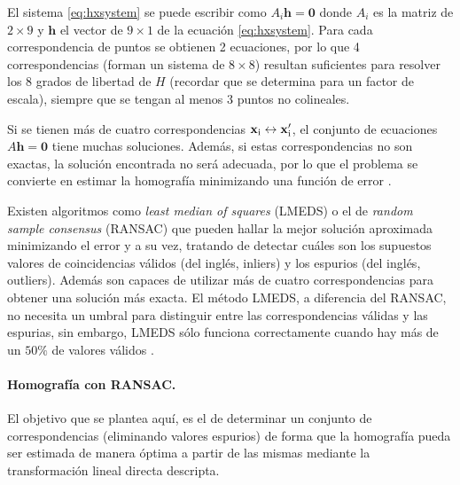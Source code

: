 El sistema \ref{eq:hxsystem} se puede escribir como $A_{i} \mathbf{h}=\mathbf{0}$ donde $A_{i}$ es la matriz de $2 \times 9$ y $\mathbf{h}$ el vector de $9 \times 1$ de la ecuación \eqref{eq:hxsystem}. Para cada correspondencia de puntos se obtienen 2 ecuaciones, por lo que 4 correspondencias (forman un sistema de $8 \times 8$) resultan suficientes para resolver los 8 grados de libertad de $\textit{H}$ (recordar que se determina para un factor de escala), siempre que se tengan al menos 3 puntos no colineales.

Si se tienen más de cuatro correspondencias $\mathbf{x_{\textrm{i}}\leftrightarrow x_{\textrm{i}}^{\textrm{\ensuremath{\prime}}}}$, el conjunto de ecuaciones $A\mathbf{h}=\mathbf{0}$ tiene muchas soluciones. Además, si estas correspondencias no son exactas, la solución encontrada no será adecuada, por lo que el problema se convierte en estimar la homografía minimizando una función de error \cite{Hartley2004}.

Existen algoritmos como \textit{least median of squares} (LMEDS) \cite{Rousseuw_1994} o el de \textit{random sample consensus} (RANSAC)\cite{Fischler:1981:RSC:358669.358692, Hartley2004} que pueden hallar la mejor solución aproximada minimizando el error y a su vez, tratando de detectar cuáles son los supuestos valores de coincidencias válidos (del inglés, inliers) y los espurios (del inglés, outliers). Además son capaces de utilizar más de cuatro correspondencias para obtener una solución más exacta. El método LMEDS, a diferencia del RANSAC, no necesita un umbral para distinguir entre las correspondencias válidas y las espurias, sin embargo, LMEDS sólo funciona correctamente cuando hay más de un $50\%$ de valores válidos \cite{Hartley2004, BenhimaneNGGNM08}.
\paragraph{Homografía con RANSAC.}
El objetivo que se plantea aquí, es el de determinar un conjunto de correspondencias (eliminando valores espurios) de forma que la homografía pueda ser estimada de manera óptima a partir de las mismas mediante la transformación lineal directa descripta.

